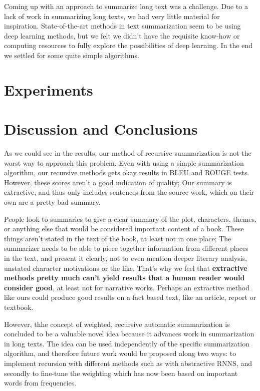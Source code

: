 Coming up with an approach to summarize long text was a challenge. Due to a
lack of work in summarizing long texts, we had very little material for
inspiration. State-of-the-art methods in text summarization seem to be using
deep learning methods, but we felt we didn't have the requisite know-how or
computing resources to fully explore the possibilities of deep learning. 
In the end we settled for some quite simple algorithms.





\section{Experiments}



\section{Discussion and Conclusions} 
As we could see in the results, our method of recursive summarization is not
the worst way to approach this problem. Even with using a simple summarization
algorithm, our recursive methods gets okay results in BLEU and ROUGE tests.
However, these scores aren't a good indication of quality; Our summary is
extractive, and thus only includes sentences from the source work, which on
their own are a pretty bad summary.

People look to summaries to give a clear summary of the plot, characters,
themes, or anything else that would be considered important content of a book.
These things aren't stated in the text of the book, at least not in one place;
The summarizer needs to be able to piece together information from different
places in the text, and present it clearly, not to even mention deeper literary
analysis, unstated character motivations or the like. That's why we feel that
\textbf{extractive methods pretty much can't yield results that a human reader
would consider good}, at least not for narrative works. Perhaps an extractive
method like ours could produce good results on a fact based text, like an
article, report or textbook.

However, thhe concept of weighted, recursive automatic summarization is
concluded to be a valuable novel idea because it advances work in summarization
in long texts.  The idea can be used independently of the specific
summarization algorithm, and therefore future work would be proposed along two
ways: to implement recursion with different methods such as with abstractive
RNNS, and secondly to fine-tune the weighting which has now been based on
important words from frequencies.
